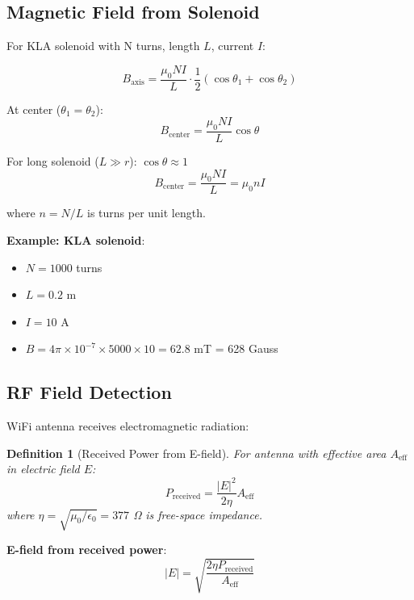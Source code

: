 \documentclass[12pt,a4paper]{article}
\newtheorem{definition}{Definition}
\begin{document}
\subsection{Magnetic Field from Solenoid}

For KLA solenoid with N turns, length $L$, current $I$:

\begin{equation}
B_{\text{axis}} = \frac{\mu_0 N I}{L} \cdot \frac{1}{2}\left(\cos\theta_1 + \cos\theta_2\right)
\end{equation}

At center ($\theta_1 = \theta_2$):
\begin{equation}
B_{\text{center}} = \frac{\mu_0 N I}{L} \cos\theta
\end{equation}

For long solenoid ($L \gg r$): $\cos\theta \approx 1$
\begin{equation}
B_{\text{center}} = \frac{\mu_0 N I}{L} = \mu_0 n I
\end{equation}

where $n = N/L$ is turns per unit length.

\textbf{Example: KLA solenoid}:
\begin{itemize}
\item $N = 1000$ turns
\item $L = 0.2$ m
\item $I = 10$ A
\item $B = 4\pi \times 10^{-7} \times 5000 \times 10 = 62.8$ mT = 628 Gauss
\end{itemize}

\subsection{RF Field Detection}

WiFi antenna receives electromagnetic radiation:

\begin{definition}[Received Power from E-field]
For antenna with effective area $A_{\text{eff}}$ in electric field $E$:
\begin{equation}
P_{\text{received}} = \frac{|E|^2}{2\eta} A_{\text{eff}}
\end{equation}
where $\eta = \sqrt{\mu_0/\epsilon_0} = 377$ Ω is free-space impedance.
\end{definition}

\textbf{E-field from received power}:
\begin{equation}
|E| = \sqrt{\frac{2\eta P_{\text{received}}}{A_{\text{eff}}}}
\end{equation}
\end{document}
